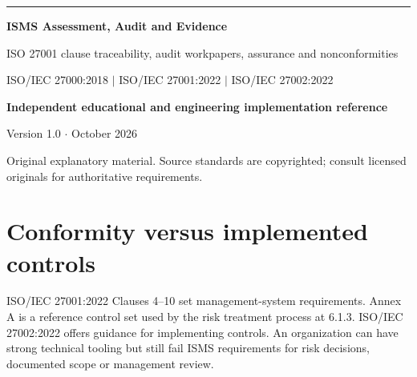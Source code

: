 \documentclass[11pt,letterpaper]{article}
\begin{document}
\begin{titlepage}
\vspace*{1.2in}
{\color{teal}\rule{\textwidth}{4pt}}\par\vspace{20pt}
{\Huge\bfseries\color{navy} ISMS Assessment, Audit and Evidence}\par\vspace{18pt}
{\Large\color{graytext} ISO 27001 clause traceability, audit workpapers, assurance and nonconformities}\par\vspace{1.3in}
{\large ISO/IEC 27000:2018 $\vert$ ISO/IEC 27001:2022 $\vert$ ISO/IEC 27002:2022}\par
\vfill
\textbf{Independent educational and engineering implementation reference}\par
Version 1.0 $\cdot$ October 2026\par
{\small Original explanatory material. Source standards are copyrighted; consult licensed originals for authoritative requirements.}\par
\end{titlepage}
\tableofcontents\clearpage{}
\section{Conformity versus implemented controls}
\SourceTag ISO/IEC 27001:2022 Clauses 4--10 set management-system requirements. Annex A is a reference control set used by the risk treatment process at 6.1.3. ISO/IEC 27002:2022 offers guidance for implementing controls. An organization can have strong technical tooling but still fail ISMS requirements for risk decisions, documented scope or management review.
\end{document}
